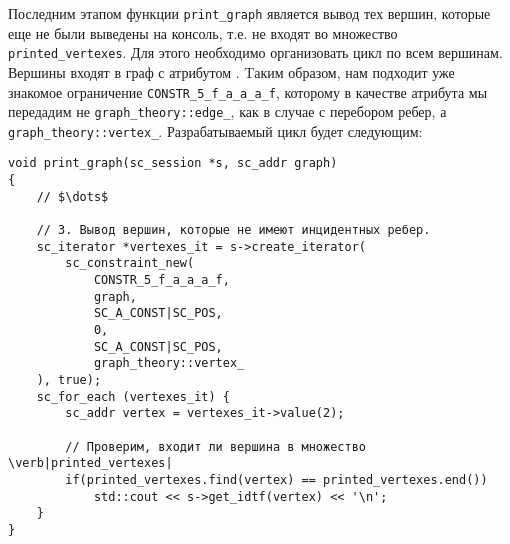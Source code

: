 Последним этапом функции \lstinline|print_graph| является вывод тех
вершин, которые еще не были выведены на консоль, т.е. не входят во
множество \lstinline|printed_vertexes|. Для этого необходимо
организовать цикл по всем вершинам.  Вершины входят в граф с атрибутом
. Tаким образом, нам подходит уже знакомое ограничение
\lstinline|CONSTR_5_f_a_a_a_f|, которому в качестве атрибута мы
передадим не \lstinline|graph_theory::edge_|, как в случае с перебором
ребер, а \lstinline|graph_theory::vertex_|. Разрабатываемый цикл будет
следующим:
\begin{lstlisting}[texcl]
void print_graph(sc_session *s, sc_addr graph)
{
    // $\dots$

    // 3. Вывод вершин, которые не имеют инцидентных ребер.
    sc_iterator *vertexes_it = s->create_iterator(
        sc_constraint_new(
            CONSTR_5_f_a_a_a_f,
            graph,
            SC_A_CONST|SC_POS,
            0,
            SC_A_CONST|SC_POS,
            graph_theory::vertex_
    ), true);
    sc_for_each (vertexes_it) {
        sc_addr vertex = vertexes_it->value(2);

        // Проверим, входит ли вершина в множество \verb|printed_vertexes|
        if(printed_vertexes.find(vertex) == printed_vertexes.end())
            std::cout << s->get_idtf(vertex) << '\n';
    }
}
\end{lstlisting}


